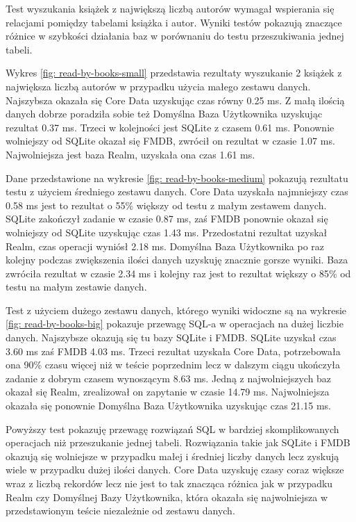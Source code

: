 Test wyszukania książek z największą liczbą autorów wymagał wspierania się relacjami pomiędzy tabelami książka i autor. Wyniki testów pokazują znaczące różnice w szybkości działania baz w porównaniu do testu przeszukiwania jednej tabeli. 

Wykres \ref{fig: read-by-books-small} przedstawia rezultaty wyszukanie 2 książek z największa liczbą autorów w przypadku użycia małego zestawu danych. Najszybsza okazała się Core Data uzyskując czas równy 0.25 ms. Z małą ilością danych dobrze poradziła sobie też Domyślna Baza Użytkownika uzyskując rezultat 0.37 ms. Trzeci w kolejności jest SQLite z czasem 0.61 ms. Ponownie wolniejszy od SQLite okazał się FMDB, zwrócił on rezultat w czasie 1.07 ms. Najwolniejsza jest baza Realm, uzyskała ona czas 1.61 ms.

Dane przedstawione na wykresie \ref{fig: read-by-books-medium} pokazują rezultatu testu z użyciem średniego zestawu danych. Core Data uzyskała najmniejszy czas 0.58 ms jest to rezultat o 55\% większy od testu z małym zestawem danych. SQLite zakończył zadanie w czasie 0.87 ms, zaś FMDB ponownie okazał się wolniejszy od SQLite uzyskując czas 1.43 ms. Przedostatni rezultat uzyskał Realm, czas operacji wyniósł 2.18 ms. Domyślna Baza Użytkownika po raz kolejny podczas zwiększenia ilości danych uzyskuję znacznie gorsze wyniki. Baza zwróciła rezultat w czasie 2.34 ms i kolejny raz jest to rezultat większy o 85\% od testu na małym zestawie danych. 

Test z użyciem dużego zestawu danych, którego wyniki widoczne są na wykresie \ref{fig: read-by-books-big} pokazuje przewagę SQL-a w operacjach na dużej liczbie danych. Najszybsze okazują się tu bazy SQLite i FMDB. SQLite uzyskał czas 3.60 ms zaś FMDB 4.03 ms. Trzeci rezultat uzyskała Core Data, potrzebowała ona 90\% czasu więcej niż w teście poprzednim lecz w dalszym ciągu ukończyła zadanie z dobrym czasem wynoszącym 8.63 ms. Jedną z najwolniejszych baz okazał się Realm, zrealizował on zapytanie w czasie 14.79 ms. Najwolniejsza okazała się ponownie Domyślna Baza Użytkownika uzyskując czas 21.15 ms. 

Powyższy test pokazuję przewagę rozwiązań SQL w bardziej skomplikowanych operacjach niż przeszukanie jednej tabeli. Rozwiązania takie jak SQLite i FMDB okazują się wolniejsze w przypadku małej i średniej liczby danych lecz zyskują wiele w przypadku dużej ilości danych. Core Data uzyskuję czasy coraz większe wraz z liczbą rekordów lecz nie jest to tak znacząca różnica jak w przypadku Realm czy Domyślnej Bazy Użytkownika, która okazała się najwolniejsza w przedstawionym teście niezależnie od zestawu danych. 

